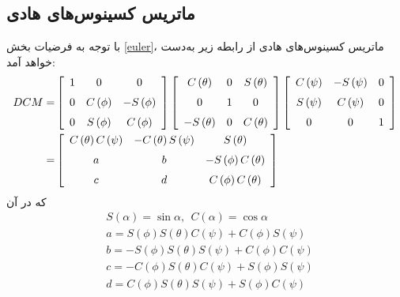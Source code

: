 \subsection{ماتریس کسینوس‌های هادی}  
با توجه به فرضیات بخش \ref{euler}، ماتریس کسینوس‌های هادی از رابطه زیر به‌دست خواهد آمد:
\begin{equation} \label{DCM}
\begin{split}
DCM=
&  \left[ 
\begin {array}{ccc} 1&0&0\\ \noalign{\medskip}0&C\left(\phi
 \right) &-S \left( \phi \right) \\ \noalign{\medskip}0&S
 \left( \phi \right) &C \left( \phi \right) \end {array} \right]
 \left[ \begin {array}{ccc} C \left( \theta \right) &0&S
 \left( \theta \right) \\ \noalign{\medskip}0&1&0\\ \noalign{\medskip}
-S \left( \theta \right) &0&C \left( \theta \right) \end {array}
 \right]    \left[ \begin {array}{ccc} C \left( \psi
 \right) &-S \left( \psi \right) &0\\ \noalign{\medskip}S
 \left( \psi \right) &C \left( \psi \right) &0\\ \noalign{\medskip}0
&0&1\end {array} \right]  \\
=& \left[ \begin {array}{ccc} C \left( \theta \right) C \left( 
\psi \right) &-C \left( \theta \right) S \left( \psi \right) &
S \left( \theta \right) \\ \noalign{\medskip}a &b&-S \left( \phi
 \right) C \left( \theta \right) \\ \noalign{\medskip}c &d &C \left( \phi
 \right) C \left( \theta \right) \end {array} \right]
\end{split}
\end{equation}
که در آن
\begin{equation} \label{DCM2}
\begin{split}
& S \left( \alpha \right)=\sin{\alpha}, \ \ C \left( \alpha \right)=\cos{\alpha} \\
& a=S \left( \phi
 \right) S \left( \theta \right) C \left( \psi \right) +C
 \left( \phi \right) S \left( \psi \right)\\
&  b=-S \left( \phi
 \right) S \left( \theta \right) S \left( \psi \right) +C
 \left( \phi \right) C \left( \psi \right) \\
&  c=-C \left( 
\phi \right) S \left( \theta \right) C \left( \psi \right) +S
 \left( \phi \right) S \left( \psi \right)\\
& d=C \left( \phi
 \right) S \left( \theta \right) S \left( \psi \right)+ S
 \left( \phi \right) C \left( \psi \right)
 \end{split}
\end{equation}
